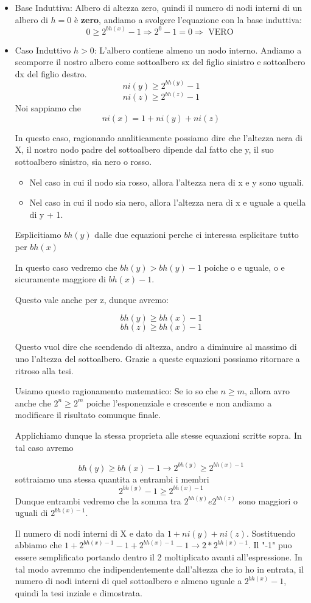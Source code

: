 \begin{itemize}
	\item Base Induttiva: Albero di altezza zero, quindi il numero di nodi interni di un albero di $h=0$ è \textbf{zero}, andiamo a svolgere l'equazione con la base induttiva:
	$$ 0 \ge 2^{bh(x)}-1 \Rightarrow 2^0-1 = 0 \Rightarrow \text{ VERO }$$
	
	
	\item Caso Induttivo $h > 0$: L'albero contiene almeno un nodo interno. 
	Andiamo a scomporre il nostro albero come sottoalbero sx del figlio sinistro e sottoalbero dx del figlio destro.
	$$ ni(y) \ge 2^{bh(y)}-1 $$
	$$ ni(z) \ge 2^{bh(z)}-1 $$
	Noi sappiamo che 
	$$ ni(x)=1+ni(y)+ni(z) $$
	
	In questo caso, ragionando analiticamente possiamo dire che l'altezza nera di X, il nostro nodo padre del sottoalbero dipende dal fatto che y, il suo sottoalbero sinistro, sia nero o rosso.
	\begin{itemize}
		\item Nel caso in cui il nodo sia rosso, allora l'altezza nera di x e y sono uguali.
		\item Nel caso in cui il nodo sia nero, allora l'altezza nera di x e uguale a quella di y + 1.
	\end{itemize}
	
	Esplicitiamo $bh(y)$ dalle due equazioni perche ci interessa esplicitare tutto per $bh(x)$

	In questo caso vedremo che $bh(y) > bh(y) - 1$ poiche o e uguale, o e sicuramente maggiore di $bh(x) - 1$.
	
	Questo vale anche per z, dunque avremo:
	
	$$bh(y) \ge bh(x) -1$$
	$$bh(z) \ge bh(x) -1$$

	Questo vuol dire che scendendo di altezza, andro a diminuire al massimo di uno l'altezza del sottoalbero. Grazie a queste equazioni possiamo ritornare a ritroso alla tesi.
	

	Usiamo questo ragionamento matematico: Se io so che $n \ge m$, allora avro anche che $ 2^{n} \ge 2^{m}$ poiche l'esponenziale e crescente e non andiamo a modificare il risultato comunque finale. 
	
	Applichiamo dunque la stessa proprieta alle stesse equazioni scritte sopra. In tal caso avremo 
	
	$$bh(y) \ge bh(x) -1 \rightarrow 2^{bh(y)} \ge 2^{bh(x)-1} $$
	sottraiamo una stessa quantita a entrambi i membri
	$$2^{bh(y)}-1  \ge 2^{bh(x)-1}$$
	Dunque entrambi vedremo che la somma tra $2^{bh(y)} e 2^{bh(z)}$ sono maggiori o uguali di $2^{bh(x)-1}$.
	
	Il numero di nodi interni di X e dato da $1 + ni(y)+ ni(z)$. Sostituendo abbiamo che $1 + 2^{bh(x) - 1} -1 + 2^{bh(x)-1}-1 \rightarrow 2*2^{bh(x)-1}$. Il "-1" puo essere semplificato portando dentro il 2 moltiplicato avanti all'espressione. In tal modo avremmo che indipendentemente dall'altezza che io ho in entrata, il numero di nodi interni di quel sottoalbero e almeno uguale a $2^{bh(x)}-1$, quindi la tesi inziale e dimostrata.
	
	
\end{itemize}

